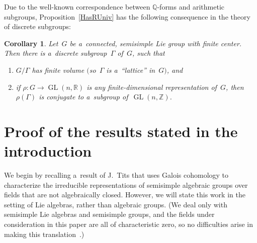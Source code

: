 \documentclass[pdftex]{sigma}
\DeclareMathOperator{\GL}{GL}
\numberwithin{equation}{section}
\newtheorem{cor}[prop]{Corollary}
\begin{document}
Due to the well-known correspondence between $\mathbb{Q}$-forms and arithmetic subgroups, Proposition~\ref{HasRUniv} has the
following consequence in the theory of discrete subgroups:

\begin{cor}
\label{LattAppl}
Let~$G$ be a~connected, semisimple Lie group with finite center.
Then there is a~discrete subgroup~$\Gamma$ of~$G$, such that
\renewcommand{\labelenumi}{{\rm (\theenumi)}}
\begin{enumerate}\itemsep=0pt
\item $G/\Gamma$ has finite volume $($so~$\Gamma$ is a~``lattice'' in~$G)$, and
\item if $\rho \colon G \to \GL(n,\mathbb{R})$ is any finite-dimensional representation of~$G$, then $\rho(\Gamma)$ is
conjugate to a~subgroup of~$\GL(n,\mathbb{Z})$.
\end{enumerate}
\end{cor}

\section{Proof of the results stated in the introduction}\label{PfSect}

We begin by recalling a~result of J.~Tits that uses Galois cohomology to characterize the irreducible representations of
semisimple algebraic groups over f\/ields that are not algebraically closed.
However, we will state this work in the setting of Lie algebras, rather than algebraic groups.
(We deal only with semisimple Lie algebras and semisimple groups, and the f\/ields under consideration in this paper are
all of characteristic zero, so no dif\/f\/iculties arise in making this translation~\cite[Proposition~7.3.1(iii), p.~393]{DemazureGrothendieck-SGA3}.)
\end{document}
